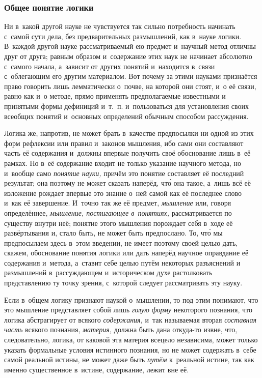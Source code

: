 \subsubsection{Общее понятие логики}
Ни в~какой другой науке не чувствуется так
сильно потребность начинать с~самой сути дела, без предварительных
размышлений, как в~науке логики. В~каждой другой науке рассматриваемый ею
предмет и~научный метод отличны друг от друга; равным образом и~содержание
этих наук не начинает абсолютно с~самого начала, а~зависит от других
понятий и~находится в~связи с~облегающим его другим материалом. Вот почему за этими
науками признаётся право говорить лишь
лемматически о~почве, на которой они стоят, и~о её связи, равно как и~о
методе, прямо применять предполагаемые известными и
принятыми формы дефиниций и~т.~п. и~пользоваться для установления своих
всеобщих понятий и~основных определений обычным способом рассуждения.

Логика же, напротив, не может брать в~качестве предпосылки ни одной из этих
форм рефлексии или правил и~законов мышления, ибо сами они составляют часть
её содержания и~должны впервые получить своё обоснование лишь в~её рамках.
Но в~её содержание входит не только указание научного метода, но и~вообще
само {\em понятие науки,} причём это понятие
составляет её последний результат; она поэтому не может сказать наперёд,
чт\'{о} она такое, а~лишь всё её изложение рождает впервые это знание о~ней
самой как её последнее слово и~как её завершение. И~точно так же её
предмет, {\em мышление} или, говоря определённее,
{\em мышление, постигающее в~понятиях,} рассматривается
по существу внутри неё; понятие этого мышления порождает себя в~ходе её
развёртывания и, стало быть, не может быть предпослано. То, чт\'{о} мы
предпосылаем здесь в~этом введении, не имеет поэтому своей целью дать,
скажем, обоснование понятия логики или дать наперёд научное оправдание её
содержания и~метода, а~ставит себе целью путём некоторых разъяснений и
размышлений в~рассуждающем и~историческом духе растолковать представлению
ту точку зрения, с~которой следует рассматривать эту науку.

Если в~общем логику признают наукой о~мышлении, то под этим понимают, что
это мышление представляет собой лишь {\em голую форму}
некоторого познания, что логика абстрагирует от всякого
{\em содержания,} и~так называемая вторая
{\em составная часть} всякого познания,
{\em материя,} должна быть дана откуда-то извне, что,
следовательно, логика, от каковой эта материя всецело независима, может
только указать формальные условия истинного познания, но не может содержать
в~себе самой реальной истины, не может даже быть
{\em путём} к~реальной истине, так как именно
существенное в~истине, содержание, лежит вне её.

